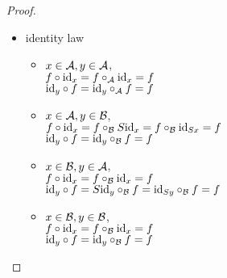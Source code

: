 \documentclass[12pt]{article}
\theoremstyle{plain}
\theoremstyle{definition}
\begin{document}
\begin{proof}
\begin{itemize}
\item identity law
 \begin{itemize}
 \item $ x \in {\cal A}, y \in {\cal A}$, \\
$f \circ {\rm id}_{x} = f \circ_{{\cal A}} {\rm id}_{x} = f$\\
${\rm id}_{y} \circ f = {\rm id}_{y} \circ_{{\cal A}} f = f$
 \item $x \in {\cal A}, y \in {\cal B}$, \\
$f \circ {\rm id}_{x} = f \circ_{{\cal B}} S{\rm id}_{x} = f \circ_{{\cal B}} {\rm id}_{Sx} = f$\\
${\rm id}_{y} \circ f = {\rm id}_{y} \circ_{{\cal B}} f = f$
 \item $ x \in {\cal B}, y \in {\cal A}$, \\
$f \circ {\rm id}_{x} = f \circ_{{\cal B}} {\rm id}_{x} = f$\\
${\rm id}_{y} \circ f = S{\rm id}_{y} \circ_{{\cal B}} f = {\rm id}_{Sy} \circ_{{\cal B}} f = f$
 \item $x \in {\cal B}, y \in {\cal B}$, \\
$f \circ {\rm id}_{x} = f \circ_{{\cal B}} {\rm id}_{x} = f$\\
${\rm id}_{y} \circ f = {\rm id}_{y} \circ_{{\cal B}} f = f$
 \end{itemize}

\end{itemize}
\end{proof}
\end{document}
